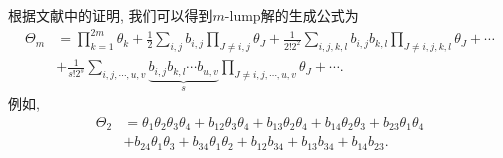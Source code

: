 根据文献\cite{satsuma1979two}中的证明, 我们可以得到$m$-lump解的生成公式为
\begin{equation}
\begin{split}
    \Theta_m&=\prod_{k=1}^{2m}\theta_k+\frac{1}{2}\sum_{i,j}{b_{i,j}}\prod_{J\neq i,j}{\theta_J}+\frac{1}{2! 2^2}\sum_{i,j,k,l}{b_{i,j}b_{k,l}}\prod_{J\neq i,j,k,l}{\theta_{J}}+\cdots \\
    &+\frac{1}{s!2^s}\sum_{i,j,\cdots,u,v}\underbrace{{b_{i,j}b_{k,l}\cdots b_{u,v}}}_{s}\prod_{J\neq i,j,\cdots, u,v}{\theta_J}+\cdots. \label{f-lump-old}
\end{split}
\end{equation}
例如, 
\begin{equation}
\renewcommand{\t}[1]{\theta_{#1}}
\renewcommand{\b}[1]{b_{#1}}
\begin{split}
\Theta_2&=\t{1}\t{2}\t{3}\t{4}+\b{12}\t{3}\t{4}+\b{13}\t{2}\t{4}+\b{14}\t{2}\t{3}+\b{23}\t{1}\t{4}\\
&+\b{24}\t{1}\t{3}+\b{34}\t{1}\t{2}+\b{12}\b{34}+\b{13}\b{34}+\b{14}\b{23}.
\end{split}
\end{equation}

